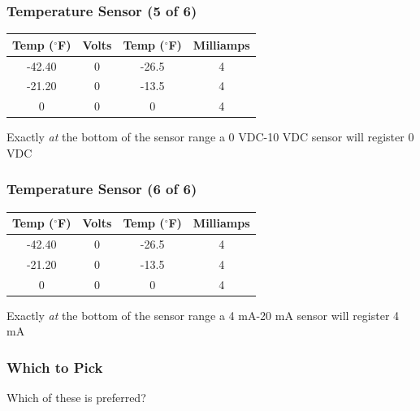 \begin{frame}
    \frametitle{Temperature Sensor (5 of 6)}

    \begin{table}
        \centering
        \begin{tabular}{|c|c|c|c|}
            \hline
            Temp ($^\circ$F) & Volts & Temp ($^\circ$F) & Milliamps\\
            \hline
             -42.40 & 0 & -26.5 & 4\\
             \hline
             -21.20 & 0 & -13.5 & 4\\
             \hline
             \hline
             0 & 0 & 0 & 4\\
             \hline
        \end{tabular}
    \end{table}

    \vspace{1em}
    \centering
    {\footnotesize Exactly \emph{at} the bottom of the sensor range a 0 VDC-10 VDC sensor will register 0 VDC\par}
\end{frame}

\begin{frame}
    \frametitle{Temperature Sensor (6 of 6)}

    \begin{table}
        \centering
        \begin{tabular}{|c|c|c|c|}
            \hline
            Temp ($^\circ$F) & Volts & Temp ($^\circ$F) & Milliamps\\
            \hline
             -42.40 & 0 & -26.5 & 4\\
             \hline
             -21.20 & 0 & -13.5 & 4\\
             \hline
             \hline
             0 & 0 & 0 & 4\\
             \hline
        \end{tabular}
    \end{table}

    \vspace{1em}
    \centering
    {\footnotesize Exactly \emph{at} the bottom of the sensor range a 4 mA-20 mA sensor will register 4 mA\par}
\end{frame}

\begin{frame}
    \frametitle{Which to Pick}

    \centering
    \Large{Which of these is preferred?}
\end{frame}

